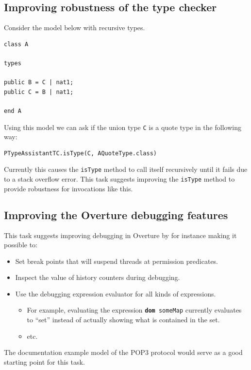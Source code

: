 \documentclass[11pt]{report}
\begin{document}
\newpage

\subsection*{Improving robustness of the type checker}

Consider the model below with recursive types.

\begin{lstlisting}
class A
 
types
 
public B = C | nat1; 
public C = B | nat1; 
 
end A
\end{lstlisting}

Using this model we can ask if the union type \texttt{C} is a quote type in the following way:

\begin{lstlisting}
PTypeAssistantTC.isType(C, AQuoteType.class)
\end{lstlisting}

Currently this causes the \texttt{isType} method to call itself recursively until it fails due to a stack overflow error. This task suggests improving the \texttt{isType} method to provide robustness for invocations like this.

\subsection*{Improving the Overture debugging features}

This task suggests improving debugging in Overture by for instance making it possible to:

\begin{itemize}
\item Set break points that will suspend threads at permission predicates.
\item Inspect the value of history counters during debugging.
\item Use the debugging expression evaluator for all kinds of expressions.
\begin{itemize}
\item For example, evaluating the expression \texttt{\textbf{dom} someMap} currently evaluates to ``set'' instead of actually showing what is contained in the set.
\item etc.
\end{itemize}
\end{itemize}

The documentation example model of the POP3 protocol would serve as a good starting point for this task.
\end{document}
